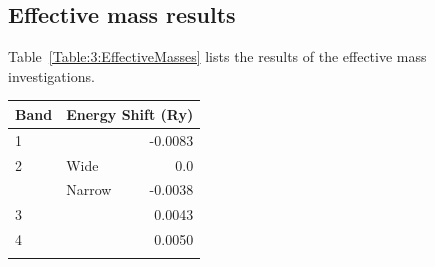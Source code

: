 \subsection{Effective mass results}

Table~\ref{Table:3:EffectiveMasses} lists the results of the effective mass investigations.
\medskip
\begin{center}
    \begin{tabular}[h!]{llr}
\toprule
Band    & \multicolumn{2}{l}{Energy Shift (\unit{Ry})} \\
\midrule
1       &       & -0.0083      \\
2       & Wide  & 0.0          \\
        & Narrow & -0.0038     \\
3       &       & 0.0043       \\
4       &       & 0.0050        \\
\bottomrule
    \label{Table:3:EnergyShifts}
    \end{tabular}
\end{center}

